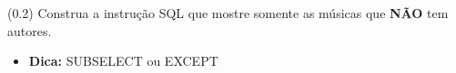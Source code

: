 \documentclass[12pt]{exam}
\begin{document}
\begin{questions}







\question (0.2)  Construa a instrução SQL que mostre somente as músicas que \textbf{NÃO} tem autores.

\begin{itemize}
    \item \textbf{Dica:} SUBSELECT ou EXCEPT
\end{itemize}




\end{questions}
\end{document}
